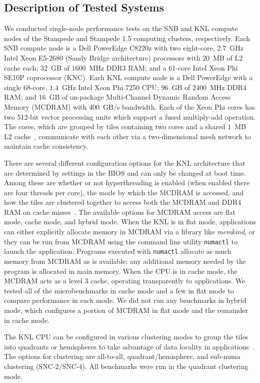 \subsection{Description of Tested Systems}

We conducted single-node performance tests on the SNB and KNL compute nodes of the
Stampede and Stampede 1.5 computing clusters, respectively. Each SNB compute node
is a Dell PowerEdge C8220z with two eight-core, $2.7$~GHz Intel Xeon E5-2680 (Sandy Bridge
architecture) processors with $20$~MB of L2 cache each; $32$~GB of $1600$~MHz DDR3 RAM;
and a 61-core Intel Xeon Phi SE10P coprocessor (KNC). Each KNL compute node is
a Dell PowerEdge with a single 68-core, $1.4$~GHz Intel Xeon Phi 7250 CPU; $96$~GB of $2400$~MHz DDR4 RAM; and $16$~GB of on-package Multi-Channel
Dynamic Random Access Memory (MCDRAM) with $400$~GB/s bandwidth. Each of the Xeon Phi
cores has two 512-bit vector processing units which support a fused multiply-add
operation. The cores, which are grouped by tiles containing two cores and a shared $1$~MB
L2 cache~\cite{intel:xeonphi}, communicate with each other via a two-dimensional mesh
network to maintain cache consistency.

There are several different configuration options for the KNL architecture that are
determined by settings in the BIOS and can only be changed at boot time. Among these are
whether or not hyperthreading is enabled (when enabled there are four threads per core), the mode by
which the MCDRAM is accessed, and how the tiles are clustered together to access both the
MCDRAM and DDR4 RAM on cache misses~\cite{vladimirov:knlModes, asai:mcdramKnl}.  The
available options for MCDRAM access are flat mode, cache mode, and hybrid mode.  When the
KNL is in flat mode, applications can either explicitly allocate memory in MCDRAM via a
library like \textit{memkind}, or they can be run from MCDRAM using the command line
utility \texttt{numactl} to launch the application. Programs executed with
\texttt{numactl} allocate as much memory from MCDRAM as is available; any additional
memory needed by the program is allocated in main memory. When the CPU is in cache mode,
the MCDRAM acts as a level 3 cache, operating transparently to applications. We tested all
of the microbenchmarks in cache mode and a few in flat mode to compare performance in each
mode. We did not run any benchmarks in hybrid mode, which configures a portion of MCDRAM
in flat mode and the remainder in cache mode.

The KNL CPU can be configured in various clustering modes to group the tiles into
quadrants or hemispheres to take advantage of data locality in
applications~\cite{vladimirov:knlModes}. The options for clustering are all-to-all,
quadrant/hemisphere, and sub-numa clustering (SNC-2/SNC-4). All benchmarks were run in the
quadrant clustering mode.

